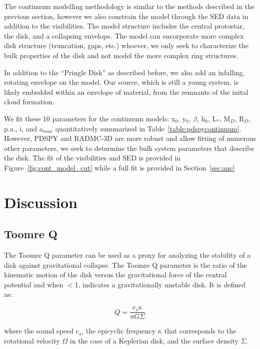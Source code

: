 \documentclass[preprint,12pt]{aastex62}
\begin{document}
The continuum modelling methodology is similar to the methods described in the previous section, however we also constrain the model through the SED data in addition to the visibilities. The model structure includes the central protostar, the disk, and a collapsing envelope. The model can encorporate more complex disk structure (truncation, gaps, etc.) whoever, we only seek to characterize the bulk properties of the disk and not model the more complex ring structures. 

In addition to the ``Pringle Disk'' as described before, we also add an infalling, rotating envelope on the model. Our source, which is still a young system, is likely embedded within an envelope of material, from the remnants of the inital cloud formation.

We fit these 10 parameters for the continuum models: x$_{0}$, y$_{0}$, $\beta$, h$_0$, L$_{*}$, M$_{D}$,  R$_D$, p.a., i, and a$_{max}$ quantitatively summarized in Table~\ref{table:pdspycontinuum}. However, PDSPY and RADMC-3D are more robust and allow fitting of numerous other parameters, we seek to determine the bulk system parameters that describe the disk. The fit of the visibilities and SED is provided in Figure~\ref{fig:cont_model_cut} while a full fit is provided in Section~\ref{sec:anc}


\section{Discussion}\label{sec:discussion}

\subsection{Toomre Q}
The Toomre Q parameter can be used as a proxy for analyzing the stability of a disk against gravitational collapse. The Toomre Q parameter is the ratio of the kinematic motion of the disk versus the gravitational force of the central potential and when $<$1, indicates a gravitationally unstable disk. It is defined as: 

\begin{equation}
Q = \frac{c_{s} \kappa}{\pi G \Sigma}
\end{equation}

where the sound speed c$_s$, the epicyclic frequency $\kappa$ that corresponds to the rotational velocity $\Omega$ in the case of a Keplerian disk, and the surface density $\Sigma$. 
\end{document}

